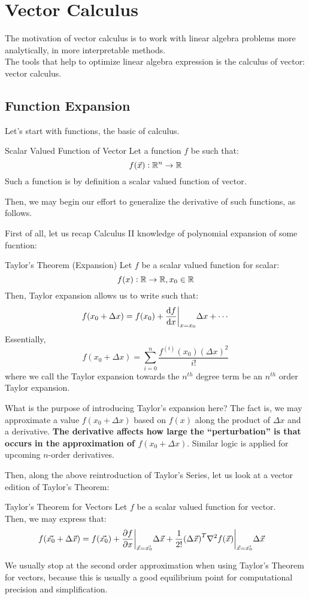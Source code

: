 \chapter{Vector Calculus}
The motivation of vector calculus is to work with linear algebra problems more analytically, in more interpretable methods. \\
The tools that help to optimize linear algebra expression is the calculus of vector: vector calculus.

\section{Function Expansion}
Let's start with functions, the basic of calculus.
\begin{ln-define}{Scalar Valued Function of Vector}{}
    Let a function $f$ be such that:
    \[
        f(\vec{x}): \mathbb{R}^n \rightarrow \mathbb{R}
    \]
    Such a function is by definition a scalar valued function of vector.
\end{ln-define}
Then, we may begin our effort to generalize the derivative of such functions, as follows.

First of all, let us recap Calculus II knowledge of polynomial expansion of some fucntion:
\begin{ln-theorem}{Taylor's Theorem (Expansion)}{}
    Let $f$ be a scalar valued function for scalar:
    \[
        f(x) : \mathbb{R} \rightarrow \mathbb{R}, x_0 \in \mathbb{R}
    \]
    Then, Taylor expansion allows us to write such that:
    \[
        f(x_0 + \Delta x) = f(x_0) + \dv{f}{x} \bigg|_{x = x_0} \Delta x + \cdots
    \]
    Essentially, 
    \[
        f(x_0 + \Delta x) = \sum_{i = 0}^n \frac{f^{(i)}(x_0) {(\Delta x)}^2}{i!}
    \]
    where we call the Taylor expansion towards the $n^{th}$ degree term be an $n^{th}$ order Taylor expansion.
\end{ln-theorem}
What is the purpose of introducing Taylor's expansion here? The fact is, we may approximate a value $f(x_0 + \Delta x)$ based on $f(x)$ along the product of $\Delta x$ and a derivative.
\textbf{The derivative affects how large the ``perturbation'' is that occurs in the approximation of $f(x_0 + \Delta x)$}.
Similar logic is applied for upcoming $n$-order derivatives.

Then, along the above reintroduction of Taylor's Series, let us look at a vector edition of Taylor's Theorem:
\begin{ln-theorem}{Taylor's Theorem for Vectors}{}
    Let $f$ be a scalar valued function for vector. \\
    Then, we may express that:
    \begin{align*}
        f(\vec{x_0} + \Delta \vec{x})
        &= f(\vec{x_0}) + \pdv{f}{x} \bigg|_{\vec{x} = \vec{x_0}} \Delta \vec{x} + \frac{1}{2!} {(\Delta \vec{x})}^T \nabla^2 f(\vec{x}) \bigg|_{\vec{x} = \vec{x_0}} \Delta \vec{x}
    \end{align*}
\end{ln-theorem}
We usually stop at the second order approximation when using Taylor's Theorem for vectors, because this is usually a good equilibrium point for computational precision and simplification.

